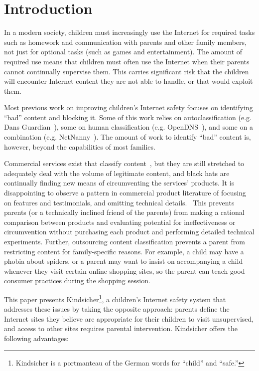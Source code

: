 

\vspace{20mm}

\section{Introduction}
\nopagebreak
In a modern society, children must increasingly use the Internet for required
tasks such as homework and communication with parents and other family
members, not just for optional tasks (such as games and entertainment).
%
The amount of required use means that children must often use the Internet
when their parents cannot continually supervise them.
%
This carries significant risk that the children will encounter Internet
content they are not able to handle, or that would exploit them.

Most previous work on improving children's Internet safety focuses on
identifying ``bad'' content and blocking it. Some of this work relies
on autoclassification (e.g. Dans Guardian~\cite{dansguardian}), some on
human classification (e.g. OpenDNS~\cite{opendns}), and some on a
combination (e.g. NetNanny~\cite{netnanny}).
%
The amount of work to identify ``bad'' content is, however, beyond the
capabilities of most families.

Commercial services exist that classify content~\cite{opendns, netnanny,
mcafee, kidlogger, k9}, but they are still stretched to adequately deal with
the volume of legitimate content, and black hats are continually finding new
means of circumventing the services' products.
%
It is disappointing to observe a pattern in commercial product literature of
focusing on features and testimonials, and omitting technical
details.~\cite{opendns, mcafee, kidlogger, k9}
%
This prevents parents (or a technically inclined friend of the parents) from
making a rational comparison between products and evaluating potential for
ineffectiveness or circumvention without purchasing each product and
performing detailed technical experiments.
%
Further, outsourcing content classification prevents a parent from restricting
content for family-specific reasons.
%
For example, a child may have a phobia about spiders, or a parent may want to
insist on accompanying a child whenever they visit certain online shopping
sites, so the parent can teach good consumer practices during the shopping
session.

This paper presents Kindsicher\footnote{Kindsicher is a portmanteau of the
German words for ``child'' and ``safe.''}, a children's Internet safety system
that addresses these issues by taking the opposite approach:
%
parents define the Internet sites they believe are appropriate for their
children to visit unsupervised, and access to other sites requires parental
intervention.
%
Kindsicher offers the following advantages:

